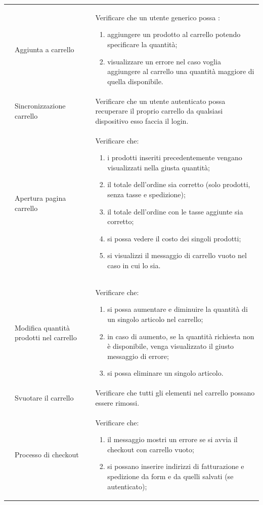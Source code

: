 \begin{center}
\begin{longtable}{|p{1cm}|p{4.85cm}|p{9cm}|}
	 & Aggiunta a carrello & Verificare che un utente generico possa : 
	\begin{enumerate}
		\item   aggiungere un prodotto al carrello potendo specificare la quantità;
		\item   visualizzare un errore nel caso voglia aggiungere al carrello una quantità maggiore di quella disponibile.
	\end{enumerate} \\

	 & Sincronizzazione carrello & Verificare che un utente autenticato possa recuperare il proprio carrello da qualsiasi dispositivo esso faccia il login.\\

	 & Apertura pagina carrello & Verificare che: 
	\begin{enumerate}
		\item i prodotti inseriti precedentemente vengano visualizzati nella giusta quantità;
		\item il totale dell'ordine sia corretto (solo prodotti, senza tasse e spedizione);
		\item il totale dell'ordine con le tasse aggiunte sia corretto;
		\item si possa vedere il costo dei singoli prodotti;
		\item si visualizzi il messaggio di carrello vuoto nel caso in cui lo sia.
	\end{enumerate} \\
	 & Modifica quantità prodotti nel carrello & Verificare che:
	\begin{enumerate}
		\item si possa aumentare e diminuire la quantità di un singolo articolo nel carrello;
		\item in caso di aumento, se la quantità richiesta non è disponibile, venga visualizzato il giusto messaggio di errore;
		\item si possa eliminare un singolo articolo.
	\end{enumerate}\\
	 & Svuotare il carrello & Verificare che tutti gli elementi nel carrello possano essere rimossi. \\
	 & Processo di checkout & Verificare che:
	\begin{enumerate}
		\item il messaggio mostri un errore se si avvia il checkout con carrello vuoto;
		\item si possano inserire indirizzi di fatturazione e spedizione da form e da quelli salvati (se autenticato);

\end{enumerate}
\end{longtable}
\end{center}
